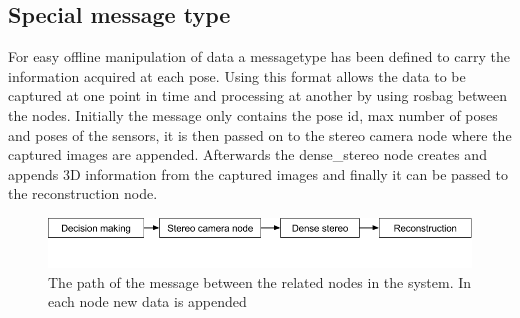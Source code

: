 
\subsection{Special message type}
For easy offline manipulation of data a messagetype has been defined to carry the information acquired at each pose. Using this format allows the data to be captured at one point in time and processing at another by using rosbag between the nodes. Initially the message only contains the pose id, max number of poses and poses of the sensors, it is then passed on to the stereo camera node where the captured images are appended. Afterwards the dense\_stereo node creates and appends 3D information from the captured images and finally it can be passed to the reconstruction node.

\begin{figure}[htb]
	\begin{center}
		\includegraphics[scale=0.5,trim=0 50 0 0]{graphics/04_decisionmaking/message_path.png}%
		\caption{The path of the message between the related nodes in the system. In each node new data is appended}
		\label{fig:message_path}
	\end{center}
\end{figure}



